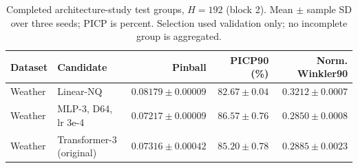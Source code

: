 \begin{table}[t]
\centering\small
\caption{Completed architecture-study test groups, $H=192$ (block 2). Mean $\pm$ sample SD over three seeds; PICP is percent. Selection used validation only; no incomplete group is aggregated.}
\label{tab:architecture-test-192-1}
\begin{tabular}{@{}llrrr@{}}
\toprule
Dataset & Candidate & Pinball & PICP90 (\%) & Norm. Winkler90 \\
\midrule
Weather & Linear-NQ & $0.08179\pm0.00009$ & $82.67\pm0.04$ & $0.3212\pm0.0007$ \\
Weather & MLP-3, D64, lr 3e-4 & $0.07217\pm0.00009$ & $86.57\pm0.76$ & $0.2850\pm0.0008$ \\
Weather & Transformer-3 (original) & $0.07316\pm0.00042$ & $85.20\pm0.78$ & $0.2885\pm0.0023$ \\
\bottomrule
\end{tabular}
\end{table}


